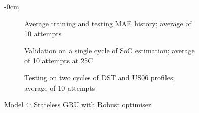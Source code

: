 \begin{figure}[H]
\begin{adjustwidth}{-\extralength}{0cm}
\begin{subfigure}[b]{0.425\textwidth}
        \caption{Average training and testing MAE history; average of 10 attempts}
    \end{subfigure}
    \hfill
    \begin{subfigure}[b]{0.425\textwidth}
        \centering
        
        \caption{Validation on a single cycle of SoC estimation; average of 10 attempts at 25\textdegree{}C}
    \end{subfigure}
    \hfill
    \begin{subfigure}[b]{0.425\textwidth}
        \centering
        
        \caption{Testing on two cycles of DST and US06 profiles; average of 10 attempts}
    \end{subfigure}
    \caption{Model 4: Stateless GRU with Robust optimiser.}
    \label{fig:Model-4res}
    \end{adjustwidth}
\end{figure}
\clearpage
